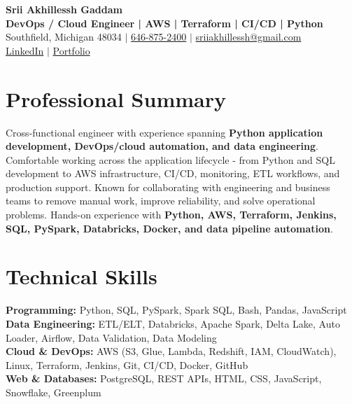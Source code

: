 \documentclass[letterpaper,10pt]{article}
\begin{document}
\fontsize{9.35pt}{10.45pt}\selectfont

\begin{center}
    {\LARGE \textbf{Srii Akhillessh Gaddam}} \\[-1pt]
    \textbf{DevOps / Cloud Engineer | AWS | Terraform | CI/CD | Python} \\[2pt]
    Southfield, Michigan 48034 $|$
    \href{tel:6468752400}{646-875-2400} $|$
    \href{mailto:sriiakhillessh@gmail.com}{sriiakhillessh@gmail.com} \\[1pt]
    \href{https://www.linkedin.com/in/srii-akhiilessh-gaddam-b48668191/}{LinkedIn} $|$
    \href{https://sriiakhillesshg.github.io/portfolio/}{Portfolio}
\end{center}
\vspace{-8pt}

\section{Professional Summary}
\small{Cross-functional engineer with experience spanning \textbf{Python application development, DevOps/cloud automation, and data engineering}. Comfortable working across the application lifecycle - from Python and SQL development to AWS infrastructure, CI/CD, monitoring, ETL workflows, and production support. Known for collaborating with engineering and business teams to remove manual work, improve reliability, and solve operational problems. Hands-on experience with \textbf{Python, AWS, Terraform, Jenkins, SQL, PySpark, Databricks, Docker, and data pipeline automation}.}

\section{Technical Skills}
\small{
\textbf{Programming:} Python, SQL, PySpark, Spark SQL, Bash, Pandas, JavaScript \\
\textbf{Data Engineering:} ETL/ELT, Databricks, Apache Spark, Delta Lake, Auto Loader, Airflow, Data Validation, Data Modeling \\
\textbf{Cloud \& DevOps:} AWS (S3, Glue, Lambda, Redshift, IAM, CloudWatch), Linux, Terraform, Jenkins, Git, CI/CD, Docker, GitHub \\
\textbf{Web \& Databases:} PostgreSQL, REST APIs, HTML, CSS, JavaScript, Snowflake, Greenplum
}
\end{document}
